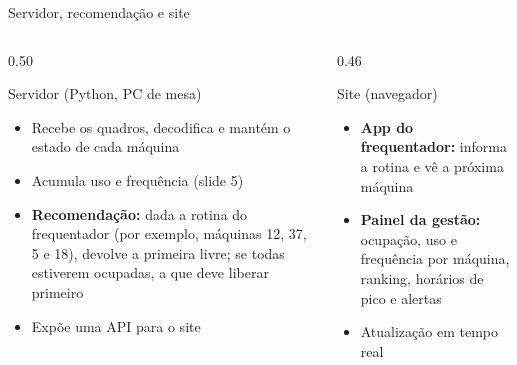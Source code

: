 \documentclass[aspectratio=169,11pt]{beamer}
\begin{document}
\begin{frame}[t]{Servidor, recomendação e site}
  \begin{columns}[T]
    \begin{column}{0.50\textwidth}
      \begin{block}{Servidor (Python, PC de mesa)}
        \footnotesize
        \begin{itemize}
          \item Recebe os quadros, decodifica e mantém o estado de cada máquina
          \item Acumula uso e frequência (slide 5)
          \item \textbf{Recomendação:} dada a rotina do frequentador (por exemplo, máquinas 12, 37, 5 e 18), devolve a primeira livre; se todas estiverem ocupadas, a que deve liberar primeiro
          \item Expõe uma API para o site
        \end{itemize}
      \end{block}
    \end{column}
    \begin{column}{0.46\textwidth}
      \begin{block}{Site (navegador)}
        \footnotesize
        \begin{itemize}
          \item \textbf{App do frequentador:} informa a rotina e vê a próxima máquina
          \item \textbf{Painel da gestão:} ocupação, uso e frequência por máquina, ranking, horários de pico e alertas
          \item Atualização em tempo real
        \end{itemize}
      \end{block}
    \end{column}
  \end{columns}
\end{frame}
\end{document}
